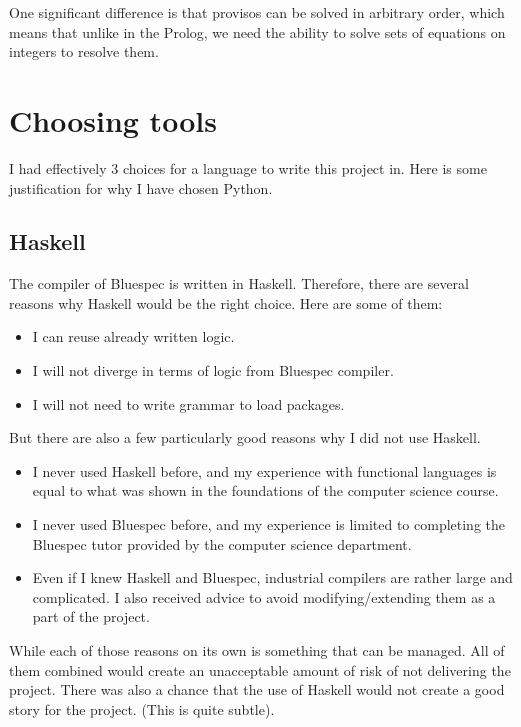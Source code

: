 \documentclass[12pt]{report}
\begin{document}
One significant difference is that provisos can be solved in arbitrary order, which means that unlike in the Prolog, we need the ability to solve sets of equations on integers to resolve them.

\section{Choosing tools}
I had effectively 3 choices for a language to write this project in. Here is some justification for why I have chosen Python.   

\subsection{Haskell}  

The compiler of Bluespec is written in Haskell. Therefore, there are several reasons why Haskell would be the right choice. Here are some of them:  
\begin{itemize}  
   \item I can reuse already written logic.  
   \item I will not diverge in terms of logic from Bluespec compiler.  
   \item I will not need to write grammar to load packages.  
\end{itemize}  
But there are also a few particularly good reasons why I did not use Haskell.  
\begin{itemize}  

   \item I never used Haskell before, and my experience with functional languages is equal to what was shown in the foundations of the computer science course.  

   \item I never used Bluespec before, and my experience is limited to completing the Bluespec tutor provided by the computer science department.  

   \item Even if I knew Haskell and Bluespec, industrial compilers are rather large and complicated. I also received advice to avoid modifying/extending them as a part of the project.  

\end{itemize}  

While each of those reasons on its own is something that can be managed. All of them combined would create an unacceptable amount of risk of not delivering the project. There was also a chance that the use of Haskell would not create a good story for the project. (This is quite subtle). 
\end{document}
